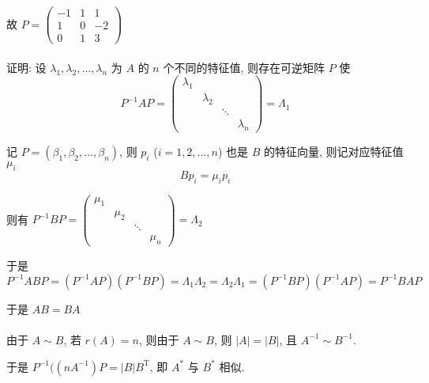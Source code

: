\begin{enumerate}
			       故 \( P = \begin{pmatrix}
				       -1 & 1 & 1  \\
				       1  & 0 & -2 \\
				       0  & 1 & 3
			       \end{pmatrix} \)
		 \end{enumerate}


	 \paragraph{} %
		 证明: 设 \( \lambda_{1}, \lambda_{2}, \dots, \lambda_{n} \) 为 \( A \) 的 \( n \) 个不同的特征值, 则存在可逆矩阵 \( P \) 使
		 \[ P^{-1}AP = \begin{pmatrix}
				 \lambda_{1} &             &                      \\
				             & \lambda_{2} &                      \\
				             &             & \ddots &             \\
				             &             &        & \lambda_{n}
			 \end{pmatrix} = \Lambda_{1} \]

		 记 \( P = (\beta_{1}, \beta_{2}, \dots, \beta_{n}) \), 则 \( p_{i} \) (\( i=1,2,\dots,n \)) 也是 \( B \) 的特征向量, 则记对应特征值 \( \mu_{i} \)
		 \[ Bp_{i} = \mu_{i}p_{i} \]

		 则有 \( P^{-1}BP = \begin{pmatrix}
			 \mu_{1} &         &                  \\
			         & \mu_{2} &                  \\
			         &         & \ddots &         \\
			         &         &        & \mu_{n}
		 \end{pmatrix} = \Lambda_{2} \)

		 于是 \( P^{-1}ABP = (P^{-1}AP)(P^{-1}BP) = \Lambda_{1}\Lambda_{2} = \Lambda_{2}\Lambda_{1} = (P^{-1}BP)(P^{-1}AP) = P^{-1}BAP \)

		 于是 \( AB = BA \)


	 \paragraph{} %
		 由于 \( A \sim B \), 若 \( r(A) = n \), 则由于 \( A \sim B \), 则 \( |A| = |B| \), 且 \( A^{-1} \sim B^{-1} \).

		 于是 \( P^{-1}((nA^{-1})P = |B|B^{\mathrm{T}} \), 即 \( A^{*} \) 与 \( B^{*} \) 相似.

